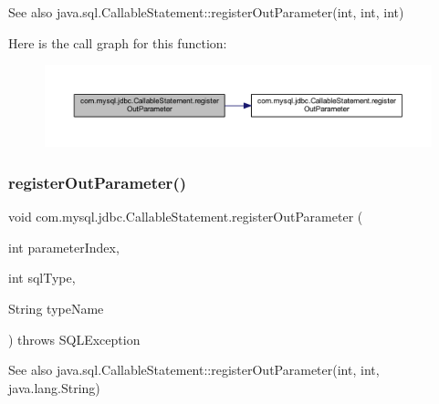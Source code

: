 \begin{DoxySeeAlso}{See also}
java.\+sql.\+Callable\+Statement\+::register\+Out\+Parameter(int, int, int) 
\end{DoxySeeAlso}
Here is the call graph for this function\+:\nopagebreak
\begin{figure}[H]
\begin{center}
\leavevmode
\includegraphics[width=350pt]{classcom_1_1mysql_1_1jdbc_1_1_callable_statement_aee8ffa31c60e761946b76031493a3682_cgraph}
\end{center}
\end{figure}
\mbox{\label{classcom_1_1mysql_1_1jdbc_1_1_callable_statement_a0f7620f0e4d1315e1a3ed826860039de}} 
\subsubsection{\texorpdfstring{register\+Out\+Parameter()}{registerOutParameter()}\hspace{0.1cm}{\footnotesize\ttfamily [3/6]}}
{\footnotesize\ttfamily void com.\+mysql.\+jdbc.\+Callable\+Statement.\+register\+Out\+Parameter (\begin{DoxyParamCaption}\item[{int}]{parameter\+Index,  }\item[{int}]{sql\+Type,  }\item[{String}]{type\+Name }\end{DoxyParamCaption}) throws S\+Q\+L\+Exception}

\begin{DoxySeeAlso}{See also}
java.\+sql.\+Callable\+Statement\+::register\+Out\+Parameter(int, int, java.\+lang.\+String) 
\end{DoxySeeAlso}
\mbox{\label{classcom_1_1mysql_1_1jdbc_1_1_callable_statement_a89d67ced2bd6cc64c13f0eb502d9991c}} 
